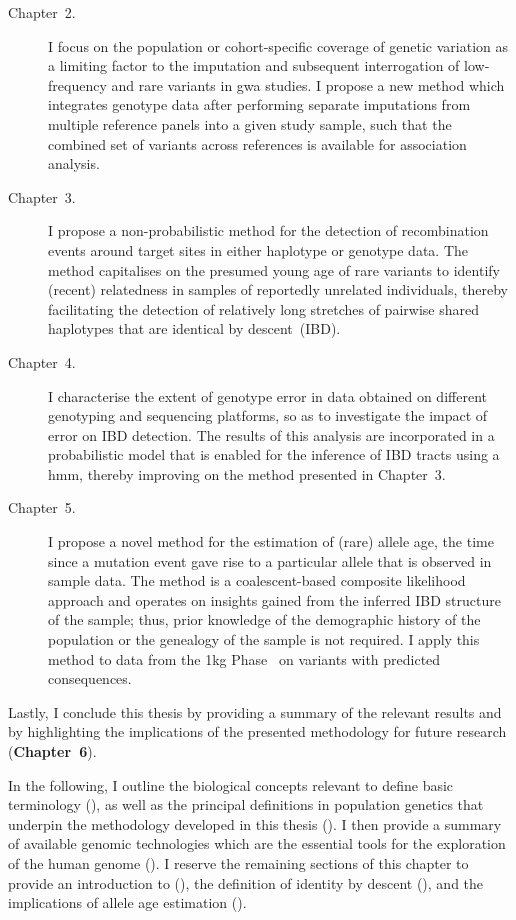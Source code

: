 \begin{description}
  \item[Chapter~2.] I focus on the population or cohort-specific coverage of genetic variation as a limiting factor to the imputation and subsequent interrogation of low-frequency and rare variants in \gls{gwa} studies.
	I propose a new method which integrates genotype data after performing separate imputations from multiple reference panels into a given study sample, such that the combined set of variants across references is available for association analysis.

  \item[Chapter~3.] I propose a non-probabilistic method for the detection of recombination events around target sites in either haplotype or genotype data.
  The method capitalises on the presumed young age of rare variants to identify (recent) relatedness in samples of reportedly unrelated individuals, thereby facilitating the detection of relatively long stretches of pairwise shared haplotypes that are identical by descent~(IBD).

  \item[Chapter~4.] I characterise the extent of genotype error in data obtained on different genotyping and sequencing platforms, so as to investigate the impact of error on IBD detection.
  The results of this analysis are incorporated in a probabilistic model that is enabled for the inference of IBD tracts using a \gls{hmm}, thereby improving on the method presented in Chapter~3.

  \item[Chapter~5.] I propose a novel method for the estimation of (rare) allele age, \ie the time since a mutation event gave rise to a particular allele that is observed in sample data.
  The method is a coalescent-based composite likelihood approach and operates on insights gained from the inferred IBD structure of the sample; thus, prior knowledge of the demographic history of the population or the genealogy of the sample is not required.
	I apply this method to data from the \gls{1kg} Phase~ on variants with predicted consequences.
\end{description}

Lastly, I conclude this thesis by providing a summary of the relevant results and by highlighting the implications of the presented methodology for future research (\textbf{Chapter~6}).



In the following, I outline the biological concepts relevant to define basic terminology (), as well as the principal definitions in population genetics that underpin the methodology developed in this thesis ().
I then provide a summary of available genomic technologies which are the essential tools for the exploration of the human genome ().
I reserve the remaining sections of this chapter to provide an introduction to  (), the definition of identity by descent (), and the implications of allele age estimation ().



